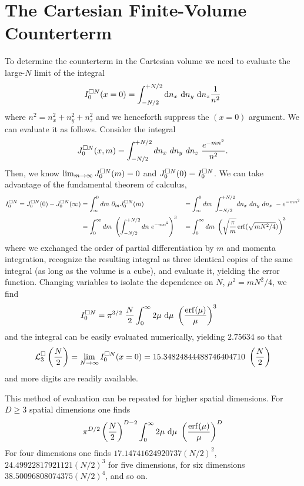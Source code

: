 \section{The Cartesian \Luscher Finite-Volume Counterterm}\label{sec:counterterm/cartesian}

To determine the counterterm in the Cartesian volume we need to evaluate the large-$N$ limit of the integral
\begin{equation}
	I^{\square N}_0(x=0) = \int_{-N/2}^{+N/2} \mathrm{d}n_x\ \mathrm{d}n_y\ \mathrm{d}n_z \frac{1}{n^2}
\end{equation}
where $n^2 = n_x^2+n_y^2+n_z^2$ and we henceforth suppress the $(x=0)$ argument.
We can evaluate it as follows.  Consider the integral
\begin{equation}
	J^{\square N}_0(x, m) = \int_{-N/2}^{+N/2} dn_x\ dn_y\ dn_z\ \frac{e^{-m n^2}}{n^2}.
\end{equation}
Then, we know $\lim_{m\rightarrow\infty} J^{\square N}_0(m) = 0$ and $J^{\square N}_0(0) = I^{\square N}_0$.
We can take advantage of the fundamental theorem of calculus,
\begin{align}
	I^{\square N}_0 = J^{\square N}_0(0) - J^{\square N}_0(\infty)
		&= 	\int_{\infty}^{0} dm\ \partial_m J^{\square N}_0(m)
		&&=	\int_{\infty}^{0} dm\ \int_{-N/2}^{+N/2} dn_x\ dn_y\ dn_z\ -e^{-m n^2}
		\nonumber\\
		&=	\int_0^\infty dm\ \left(\int_{-N/2}^{+N/2} dn\ e^{-m n^2}\right)^3
		&&=	\int_0^\infty dm\ \left(\sqrt{\frac{\pi}{m}} \operatorname{erf}(\sqrt{m N^2/4})\right)^3
\end{align}
where we exchanged the order of partial differentiation by $m$ and momenta integration, recognize the resulting integral as three identical copies of the same integral (as long as the volume is a cube), and evaluate it, yielding the error function.
Changing variables to isolate the dependence on $N$, $\mu^2 = m N^2/4$, we find
\begin{align}
    I^{\square N}_0
    &=
    \pi^{3/2}\ \frac{N}{2} \int_{0}^\infty 2\mu\ \mathrm{d}\mu\ \left(\frac{\operatorname{erf}(\mu)}{\mu}\right)^3
\end{align}
and the integral can be easily evaluated numerically, yielding $2.75634$ so that
\begin{equation}
    \mathcal{L}^\square_3 \left(\frac{N}{2}\right) = \lim_{N\rightarrow\infty}I^{\square N}_0(x=0) = 15.34824844488746404710\ \left(\frac{N}{2}\right)
\end{equation}
and more digits are readily available.

This method of evaluation can be repeated for higher spatial dimensions.
For $D\geq3$ spatial dimensions one finds
\begin{equation}
    \pi^{D/2} \left(\frac{N}{2}\right)^{D-2} \int_0^\infty 2\mu\ \mathrm{d}\mu\ \left(\frac{\operatorname{erf}(\mu)}{\mu}\right)^D
\end{equation}
For four dimensions one finds $17.14741624920737 (N/2)^2$, $24.49922817921121 (N/2)^3$ for five dimensions, for six dimensions $38.50096808074375 (N/2)^4$, and so on.

